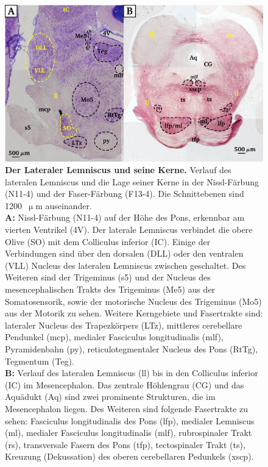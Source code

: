 \documentclass[12pt,a4paper,pdftex]{article}
\begin{document}
\begin{figure}[H]
    \centering
    \includegraphics[width = \textwidth]{pictures/auditory/lateral_lemniscus.png}
    \caption[Der Lateraler Lemniscus und seine Kerne]{\textbf{Der Lateraler Lemniscus und seine Kerne.} Verlauf des lateralen Lemniscus und die Lage seiner Kerne in der Nissl-Färbung (N11-4) und der Faser-Färbung (F13-4). Die Schnittebenen sind 1200~$\upmu$m auseinander.\\
    \textbf{A:} Nissl-Färbung (N11-4) auf der Höhe des Pons, erkennbar am vierten Ventrikel (4V).
    Der laterale Lemniscus verbindet die obere Olive (SO) mit dem Colliculus inferior (IC). Einige der Verbindungen sind über den dorsalen (DLL) oder den ventralen (VLL) Nucleus des lateralen Lemniscus zwischen geschaltet. 
    Des Weiteren sind der Trigeminus (s5) und der Nucleus des mesencephalischen Trakts des Trigeminus (Me5) aus der Somatosensorik, sowie der motorische Nucleus des Trigeminus (Mo5) aus der Motorik zu sehen. 
    Weitere Kerngebiete und Fasertrakte sind: lateraler Nucleus des Trapezkörpers (LTz), mittleres cerebellare Pendunkel (mcp), medialer Fasciculus longitudinalis (mlf), Pyramidenbahn (py), reticulotegmentaler Nucleus des Pons (RtTg), Tegmentum (Teg).\\
    \textbf{B:} Verlauf des lateralen Lemniscus (ll) bis in den Colliculus inferior (IC) im Mesencephalon. Das zentrale Höhlengrau (CG) und das Aquädukt (Aq) sind zwei prominente Strukturen, die im Mesencephalon liegen. Des Weiteren sind folgende Fasertrakte zu sehen: Fasciculus longitudinalis des Pons (lfp), medialer Lemniscus (ml), medialer Fasciculus longitudinalis (mlf), rubrospinaler Trakt (rs), transversale Fasern des Pons (tfp), tectospinaler Trakt (ts), Kreuzung (Dekussation) des oberen cerebellaren Pedunkels (xscp).}
    \label{fig:lateraler_lemniscus}
\end{figure}
\end{document}
